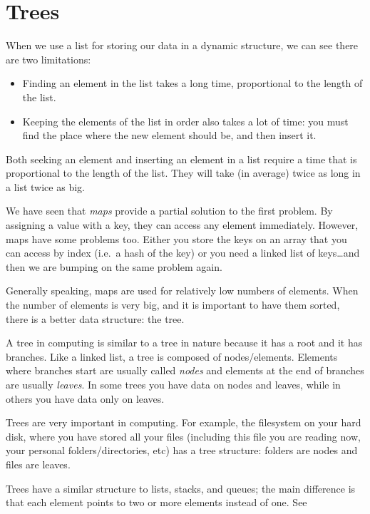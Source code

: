 
\section{Trees}
\label{sec:trees}

When we use a list for storing our data in a dynamic structure, we can
see there are two limitations: 

\begin{itemize}
\item Finding an element in the list takes a long time, proportional
  to the length of the list.
\item Keeping the elements of the list in order also takes a lot of
  time: you must find the place where the new element should be, and
  then insert it. 
\end{itemize}

Both seeking an element and inserting an element in a list require a
time that is proportional to the length of the list. They will take
(in average) twice as long in a list twice as big. 

We have seen that \emph{maps} provide a partial solution to the first
problem. By assigning a value with a key, they can access any element
immediately. However, maps have some problems too. Either you store
the keys on an array that you can access by index (i.e.~a hash of the
key) or you need a linked list of keys\ldots and then we are bumping
on the same problem again. 

Generally speaking, maps are used for relatively low numbers of
elements. When the number of elements is very big, and it 
is important to have them sorted, there is a better data structure:
the tree. 

A tree in computing is similar to a tree in nature because it has a
root and it has branches. Like a linked list, a tree is composed of
nodes/elements. Elements where branches start are usually called
\emph{nodes} and elements at the end of branches are usually
\emph{leaves}. In some trees you have data on nodes and leaves, while
in others you have data only on leaves. 

Trees are very important in computing. For example, the filesystem on
your hard disk, where you have stored all your files (including this
file you are reading now, your personal folders/directories, etc) has
a tree structure: folders are nodes and files are leaves.

Trees have a similar structure to lists, stacks, and queues; the main
difference is that each element points to two or more elements instead
of one. See 

